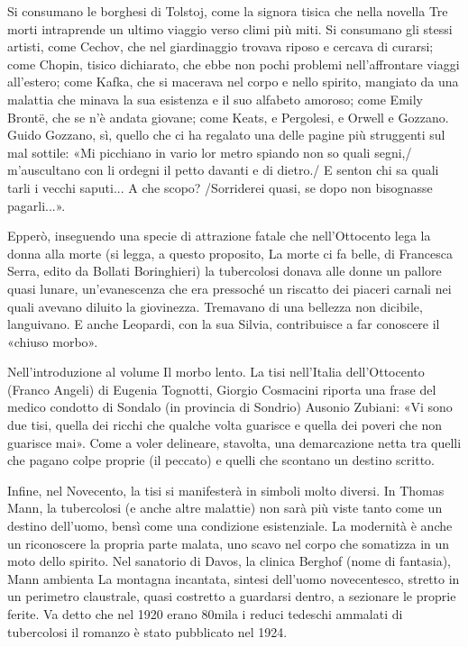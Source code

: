 \documentclass[a4paper, twoside, titlepage]{book}
\newcounter{mar}
\begin{document}
Si consumano le borghesi di Tolstoj, come la signora tisica che nella novella Tre morti intraprende un ultimo viaggio verso climi più miti. Si consumano gli stessi artisti, come Cechov, che nel giardinaggio trovava riposo e cercava di curarsi; come Chopin, tisico dichiarato, che ebbe non pochi problemi nell’affrontare viaggi all’estero; come Kafka, che si macerava nel corpo e nello spirito, mangiato da una malattia che minava la sua esistenza e il suo alfabeto amoroso; come Emily Brontë, che se n’è andata giovane; come Keats, e Pergolesi, e Orwell e Gozzano. Guido Gozzano, sì, quello che ci ha regalato una delle pagine più struggenti sul mal sottile: «Mi picchiano in vario lor metro spiando non so quali segni,/ m’auscultano con li ordegni il petto davanti e di dietro./ E senton chi sa quali tarli i vecchi saputi... A che scopo? /Sorriderei quasi, se dopo non bisognasse pagarli...».

Epperò, inseguendo una specie di attrazione fatale che nell’Ottocento lega la donna alla morte (si legga, a questo proposito, La morte ci fa belle, di Francesca Serra, edito da Bollati Boringhieri) la tubercolosi donava alle donne un pallore quasi lunare, un’evanescenza che era pressoché un riscatto dei piaceri carnali nei quali avevano diluito la giovinezza. Tremavano di una bellezza non dicibile, languivano. E anche Leopardi, con la sua Silvia, contribuisce a far conoscere il «chiuso morbo».

Nell’introduzione al volume Il morbo lento. La tisi nell’Italia dell’Ottocento (Franco Angeli) di Eugenia Tognotti, Giorgio Cosmacini riporta una frase del medico condotto di Sondalo (in provincia di Sondrio) Ausonio Zubiani: «Vi sono due tisi, quella dei ricchi che qualche volta guarisce e quella dei poveri che non guarisce mai». Come a voler delineare, stavolta, una demarcazione netta tra quelli che pagano colpe proprie (il peccato) e quelli che scontano un destino scritto.

Infine, nel Novecento, la tisi si manifesterà in simboli molto diversi. In Thomas Mann, la tubercolosi (e anche altre malattie) non sarà più viste tanto come un destino dell’uomo, bensì come una condizione esistenziale. La modernità è anche un riconoscere la propria parte malata, uno scavo nel corpo che somatizza in un moto dello spirito. Nel sanatorio di Davos, la clinica Berghof (nome di fantasia), Mann ambienta La montagna incantata, sintesi dell’uomo novecentesco, stretto in un perimetro claustrale, quasi costretto a guardarsi dentro, a sezionare le proprie ferite. Va detto che nel 1920 erano 80mila i reduci tedeschi ammalati di tubercolosi il romanzo è stato pubblicato nel 1924.
\end{document}
